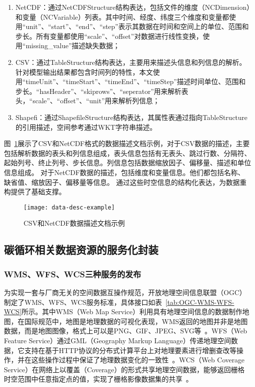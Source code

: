\begin{enumerate}[(1)]
    \item NetCDF：通过NetCDFStructure结构表达，包括文件的维度（NCDimension）和变量（NCVariable）列表。其中时间、经度、纬度三个维度和变量都使用``unit''、``start''、``end''、``step''表示其数据在时间和空间上的单位、范围和步长。所有变量都使用``scale''、``offset''对数据进行线性变换，使用``missing\_value''描述缺失数据；
    \item CSV：通过TableStructure结构表达，主要用来描述头信息和列信息的解析。针对模型输出结果都包含时间列的特性，本文使用``timeUnit''、``timeStart''、``timeEnd''、``timeStep''描述时间单位、范围和步长。``hasHeader''、``skiprows''、``seperator''用来解析表头，``scale''、``offset''、``unit''用来解析列信息；
    \item Shapefi：通过ShapefileStructure结构表达，其属性表通过指向TableStructure的引用描述，空间参考通过WKT字符串描述。
\end{enumerate}

图~\ref{fig:data-desc-example}展示了CSV和NetCDF格式的数据描述文档示例，对于CSV数据的描述，主要包括解析数据的表头和列信息组成，表头信息包括有无表头、跳过行数、分隔符、起始列号、终止列号、步长信息。列信息包括数据缩放因子、偏移量、描述和单位信息组成。
对于NetCDF数据的描述，包括维度和变量信息。他们都包括名称、缺省值、缩放因子、偏移量等信息。
通过这些时空信息的结构化表达，为数据重构提供了基础支撑。

\begin{figure}[!htbp]
    \centering
    \texttt{[image: data-desc-example]}
    \caption{CSV和NetCDF数据描述文档示例}
    \label{fig:data-desc-example}
\end{figure}

\subsection{碳循环相关数据资源的服务化封装}
\label{sec:data-service}
\subsubsection{WMS、WFS、WCS三种服务的发布}
\label{subsubsec:OGC}
为实现一套与厂商无关的空间数据互操作规范，开放地理空间信息联盟（OGC）制定了WMS、WFS、WCS服务标准，具体接口如表~\ref{tab:OGC-WMS-WFS-WCS}所示。其中WMS（Web Map Service）利用具有地理空间信息的数据制作地图，在国际规范中，地图是地理数据的可视化表现，WMS返回的地图并非是地图数据，而是地图图像，格式上可以是PNG、GIF、JPEG、SVG等~\cite{OGC-WMS}。WFS（Web Feature Service）通过GML（Geography Markup Language）传递地理空间数据，它支持在基于HTTP协议的分布式计算平台上对地理要素进行增删查改等操作，并在这些操作过程中保证了地理数据变化的一致性~\cite{OGC-WFS}。WCS（Web Coverage Service）在网络上以覆盖（Coverage）的形式共享地理空间数据，能够返回栅格时空范围中任意指定点的值，实现了栅格影像数据集的共享~\cite{OGC-WCS}。

